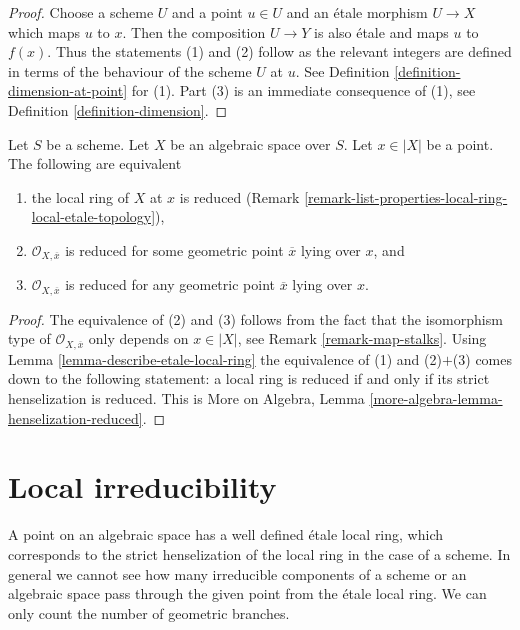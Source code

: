 \begin{proof}
Choose a scheme $U$ and a point $u \in U$ and an \'etale morphism
$U \to X$ which maps $u$ to $x$. Then the composition $U \to Y$
is also \'etale and maps $u$ to $f(x)$. Thus the statements (1) and (2)
follow as the relevant integers are defined in terms of the behaviour
of the scheme $U$ at $u$. See
Definition \ref{definition-dimension-at-point} for (1). Part (3) is
an immediate consequence of (1), see Definition \ref{definition-dimension}.
\end{proof}

\begin{lemma}
\label{lemma-reduced-local-ring}
Let $S$ be a scheme. Let $X$ be an algebraic space over $S$.
Let $x \in |X|$ be a point. The following are equivalent
\begin{enumerate}
\item the local ring of $X$ at $x$ is reduced
(Remark \ref{remark-list-properties-local-ring-local-etale-topology}),
\item $\mathcal{O}_{X, \overline{x}}$ is reduced for some geometric
point $\overline{x}$ lying over $x$, and
\item $\mathcal{O}_{X, \overline{x}}$ is reduced for any geometric
point $\overline{x}$ lying over $x$.
\end{enumerate}
\end{lemma}

\begin{proof}
The equivalence of (2) and (3) follows from the fact that the
isomorphism type of $\mathcal{O}_{X, \overline{x}}$ only depends
on $x \in |X|$, see Remark \ref{remark-map-stalks}.
Using Lemma \ref{lemma-describe-etale-local-ring}
the equivalence of (1) and (2)$+$(3) comes down to the
following statement: a local ring is reduced if and only if
its strict henselization is reduced. This is
More on Algebra, Lemma \ref{more-algebra-lemma-henselization-reduced}.
\end{proof}











\section{Local irreducibility}
\label{section-irreducible-local-ring}

\noindent
A point on an algebraic space has a well defined \'etale local ring, which
corresponds to the strict henselization of the local ring in the case of a
scheme. In general we cannot see how many irreducible components of a
scheme or an algebraic space pass through the given point from the
\'etale local ring. We can only count the number of geometric branches.

